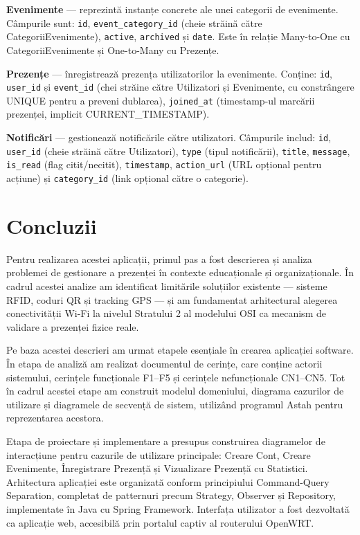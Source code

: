 \documentclass[a4paper,12pt,oneside]{report}
\begin{document}
\textbf{Evenimente} — reprezintă instanțe concrete ale unei categorii de evenimente. Câmpurile sunt: \texttt{id}, \texttt{event\_category\_id} (cheie străină către CategoriiEvenimente), \texttt{active}, \texttt{archived} și \texttt{date}. Este în relație Many-to-One cu CategoriiEvenimente și One-to-Many cu Prezențe.

\textbf{Prezențe} — înregistrează prezența utilizatorilor la evenimente. Conține: \texttt{id}, \texttt{user\_id} și \texttt{event\_id} (chei străine către Utilizatori și Evenimente, cu constrângere UNIQUE pentru a preveni dublarea), \texttt{joined\_at} (timestamp-ul marcării prezenței, \newline implicit CURRENT\_TIMESTAMP).

\textbf{Notificări} — gestionează notificările către utilizatori. Câmpurile includ: \texttt{id}, \texttt{user\_id} (cheie străină către Utilizatori), \texttt{type} (tipul notificării), \texttt{title}, \texttt{message}, \texttt{is\_read} (flag citit/necitit), \texttt{timestamp}, \texttt{action\_url} (URL opțional pentru acțiune) și \texttt{category\_id} (link opțional către o categorie).

\chapter{Concluzii}
Pentru realizarea acestei aplicații, primul pas a fost descrierea și analiza problemei de gestionare a prezenței în contexte educaționale și organizaționale. În cadrul acestei analize am identificat limitările soluțiilor existente — sisteme RFID, coduri QR și tracking GPS — și am fundamentat arhitectural alegerea conectivității Wi-Fi la nivelul Stratului 2 al modelului OSI \cite{tanenbaum04} ca mecanism de validare a prezenței fizice reale.

Pe baza acestei descrieri am urmat etapele esențiale în crearea aplicației software. În etapa de analiză am realizat documentul de cerințe, care conține actorii sistemului, cerințele funcționale F1–F5 și cerințele nefuncționale CN1–CN5. Tot în cadrul acestei etape am construit modelul domeniului, diagrama cazurilor de utilizare și diagramele de secvență de sistem, utilizând programul Astah pentru reprezentarea acestora.

Etapa de proiectare și implementare a presupus construirea diagramelor de interacțiune pentru cazurile de utilizare principale: Creare Cont, Creare Evenimente, Înregistrare Prezență și Vizualizare Prezență cu Statistici. Arhitectura aplicației este organizată conform principiului Command-Query Separation, completat de patternuri precum Strategy, Observer și Repository, implementate în Java cu Spring Framework. Interfața utilizator a fost dezvoltată ca aplicație web, accesibilă prin portalul captiv al routerului OpenWRT.
\end{document}
